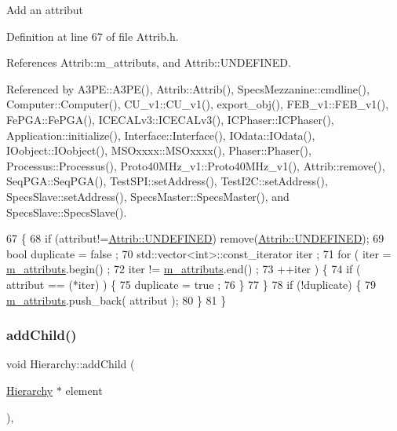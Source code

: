 Add an attribut 

Definition at line 67 of file Attrib.\+h.



References Attrib\+::m\+\_\+attributs, and Attrib\+::\+U\+N\+D\+E\+F\+I\+N\+ED.



Referenced by A3\+P\+E\+::\+A3\+P\+E(), Attrib\+::\+Attrib(), Specs\+Mezzanine\+::cmdline(), Computer\+::\+Computer(), C\+U\+\_\+v1\+::\+C\+U\+\_\+v1(), export\+\_\+obj(), F\+E\+B\+\_\+v1\+::\+F\+E\+B\+\_\+v1(), Fe\+P\+G\+A\+::\+Fe\+P\+G\+A(), I\+C\+E\+C\+A\+Lv3\+::\+I\+C\+E\+C\+A\+Lv3(), I\+C\+Phaser\+::\+I\+C\+Phaser(), Application\+::initialize(), Interface\+::\+Interface(), I\+Odata\+::\+I\+Odata(), I\+Oobject\+::\+I\+Oobject(), M\+S\+Oxxxx\+::\+M\+S\+Oxxxx(), Phaser\+::\+Phaser(), Processus\+::\+Processus(), Proto40\+M\+Hz\+\_\+v1\+::\+Proto40\+M\+Hz\+\_\+v1(), Attrib\+::remove(), Seq\+P\+G\+A\+::\+Seq\+P\+G\+A(), Test\+S\+P\+I\+::set\+Address(), Test\+I2\+C\+::set\+Address(), Specs\+Slave\+::set\+Address(), Specs\+Master\+::\+Specs\+Master(), and Specs\+Slave\+::\+Specs\+Slave().


\begin{DoxyCode}
67                             \{
68     \textcolor{keywordflow}{if} (attribut!=\hyperlink{classAttrib_a69e171d7cc6417835a5a306d3c764235a3a8da2ab97dda18aebab196fe4100531}{Attrib::UNDEFINED}) \textcolor{keyword}{remove}(\hyperlink{classAttrib_a69e171d7cc6417835a5a306d3c764235a3a8da2ab97dda18aebab196fe4100531}{Attrib::UNDEFINED});
69     \textcolor{keywordtype}{bool} duplicate = false ;
70     std::vector<int>::const\_iterator iter ;
71     \textcolor{keywordflow}{for} ( iter  = \hyperlink{classAttrib_ac4bd58a0cc6b38a3b711d609a3d3aacc}{m\_attributs}.begin() ;
72           iter != \hyperlink{classAttrib_ac4bd58a0cc6b38a3b711d609a3d3aacc}{m\_attributs}.end()   ;
73           ++iter ) \{
74       \textcolor{keywordflow}{if} ( attribut == (*iter) ) \{
75         duplicate = true ;
76       \}
77     \}
78     \textcolor{keywordflow}{if} (!duplicate) \{
79       \hyperlink{classAttrib_ac4bd58a0cc6b38a3b711d609a3d3aacc}{m\_attributs}.push\_back( attribut );
80     \}
81   \}
\end{DoxyCode}
\mbox{\label{classHierarchy_ad677774ff38fcb257c04a3a10d471fac}} 
\subsubsection{\texorpdfstring{add\+Child()}{addChild()}}
{\footnotesize\ttfamily void Hierarchy\+::add\+Child (\begin{DoxyParamCaption}\item[{\hyperlink{classHierarchy}{Hierarchy} $\ast$}]{element }\end{DoxyParamCaption})\hspace{0.3cm}{\ttfamily [virtual]}, {\ttfamily [inherited]}}



